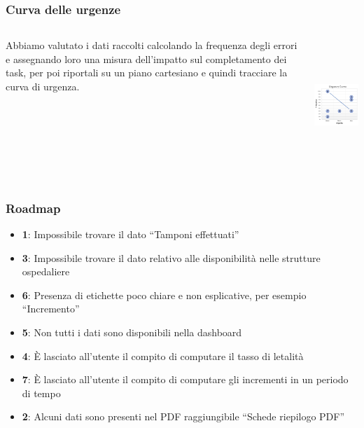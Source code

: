 \documentclass[handout]{beamer}
\begin{document}
			\begin{frame}
				\frametitle{Curva delle urgenze}
				\begin{columns}[t]
					\begin{column}[T]{5cm}
						Abbiamo valutato i dati raccolti calcolando la frequenza degli errori e assegnando loro una misura dell'impatto sul completamento dei task, per poi riportali su un piano cartesiano e quindi tracciare la curva di urgenza.
					\end{column}
					\begin{column}[T]{5cm}
						\includegraphics[height=5cm]{img/urgency_curve}
					\end{column}
				\end{columns}
			\end{frame}
		 
			\begin{frame}
				\frametitle{Roadmap}
				\begin{itemize}[<+->]
					\item<1-> \textbf{1}: Impossibile trovare il dato ``Tamponi effettuati''\\
					\item<2-> \textbf{3}: Impossibile trovare il dato relativo alle disponibilità nelle strutture ospedaliere\\
					\item<3-> \textbf{6}: Presenza di etichette poco chiare e non esplicative, per esempio ``Incremento''\\
					\item<4-> \textbf{5}: Non tutti i dati sono disponibili nella dashboard
					\item<5-> \textbf{4}: \`E lasciato all'utente il compito di computare il tasso di letalità\\
					\item<6-> \textbf{7}: \`E lasciato all'utente il compito di computare gli incrementi in un periodo di tempo\\
					\item<7-> \textbf{2}: Alcuni dati sono presenti nel PDF raggiungibile ``Schede riepilogo PDF''\\
				\end{itemize}
			\end{frame}
\end{document}
